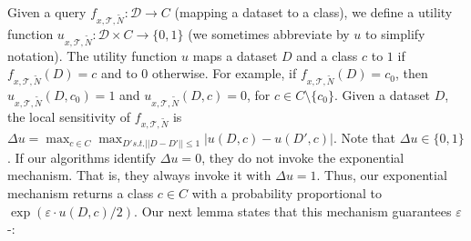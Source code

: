 \sloppy
Given a query 
$f_{x,\mathcal{T},\widetilde{N}}: \mathcal{D} \rightarrow C$ (mapping a dataset to a class), 
we define a utility function $u_{x,\mathcal{T},\widetilde{N}} : \mathcal{D} \times C \rightarrow \{0,1\}$ (we sometimes abbreviate by $u$ to simplify notation).
The utility function $u$ maps a dataset $D$ and a class $c$ to $1$ if $f_{x,\mathcal{T},\widetilde{N}}(D)=c$ and to $0$ otherwise.
For example, if $f_{x,\mathcal{T},\widetilde{N}}(D)=c_0$, then  $u_{x,\mathcal{T},\widetilde{N}}(D,c_0)=1$ and   $u_{x,\mathcal{T},\widetilde{N}}(D,c)=0$, for $c\in C\setminus\{c_0\}$.
Given a dataset $D$, the local sensitivity of $f_{x,\mathcal{T},\widetilde{N}}$ is $\Delta u = \max_{c \in C} \max_{D' s.t. ||D - D'|| \leq 1} |u(D,c) - u(D',c)|$. 
Note that $\Delta u\in\{0,1\}$. 
If our algorithms identify $\Delta u=0$, they do not invoke the exponential mechanism.
That is, they always invoke it with $\Delta u=1$. Thus, our exponential mechanism
returns a class $c \in C$ with a probability proportional to $\exp(\varepsilon\cdot u(D,c) / 2)$.  %
Our next lemma states that this mechanism guarantees $\varepsilon$-\propi:

